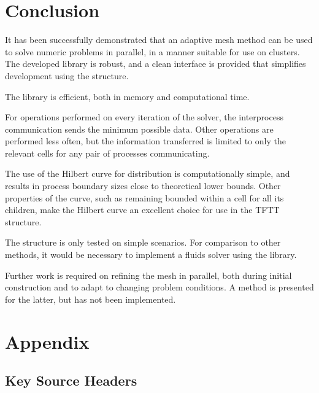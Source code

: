 \documentclass[twoside]{IIBproject}
\numberwithin{figure}{section}
\begin{document}



\section{Conclusion} %
    \label{sec:conclusions}

    It has been successfully demonstrated that an adaptive mesh method can be used to solve numeric problems in parallel, in a manner suitable for use on clusters. The developed library is robust, and a clean interface is provided that simplifies development using the structure. 

    The library is efficient, both in memory and computational time. 

    For operations performed on every iteration of the solver, the interprocess communication sends the minimum possible data. Other operations are performed less often, but the information transferred is limited to only the relevant cells for any pair of processes communicating. 

    The use of the Hilbert curve for distribution is computationally simple, and results in process boundary sizes close to theoretical lower bounds. Other properties of the curve, such as remaining bounded within a cell for all its children, make the Hilbert curve an excellent choice for use in the TFTT structure. 

    The structure is only tested on simple scenarios. For comparison to other methods, it would be necessary to implement a fluids solver using the library.

    Further work is required on refining the mesh in parallel, both during initial construction and to adapt to changing problem conditions. A method is presented for the latter, but has not been implemented. 



\printbibliography


\clearpage
\appendix

\section{Appendix} %
    \label{sec:appendix}

    \subsection{Key Source Headers} %
        \label{sec:appendix-headers}
\end{document}
